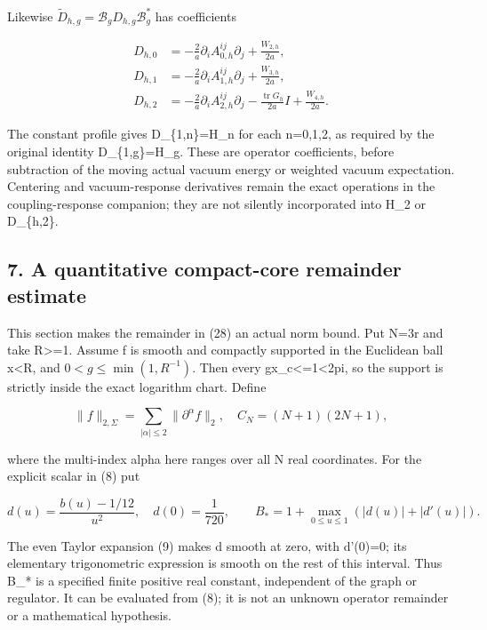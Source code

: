 \documentclass[
  11pt,
]{article}
\begin{document}
Likewise \(\widetilde D_{h,g}=\mathcal B_gD_{h,g}\mathcal B_g^*\) has
coefficients

\[
 \boxed{\begin{split}
 D_{h,0}&=-\frac2a\partial_i A_{0,h}^{ij}\partial_j
                                    +\frac{W_{2,h}}{2a},\\
 D_{h,1}&=-\frac2a\partial_i A_{1,h}^{ij}\partial_j
                                    +\frac{W_{3,h}}{2a},\\
 D_{h,2}&=-\frac2a\partial_i A_{2,h}^{ij}\partial_j
                     -\frac{\operatorname{tr}G_h}{2a}I
                                    +\frac{W_{4,h}}{2a}.
 \end{split}}                                                \tag{29}
\]

The constant profile gives D\_\{1,n\}=H\_n for each n=0,1,2, as required
by the original identity D\_\{1,g\}=H\_g. These are operator
coefficients, before subtraction of the moving actual vacuum energy or
weighted vacuum expectation. Centering and vacuum-response derivatives
remain the exact operations in the coupling-response companion; they are
not silently incorporated into H\_2 or D\_\{h,2\}.

\subsection{7. A quantitative compact-core remainder
estimate}\label{weak-coupling-part-14-a-quantitative-compact-core-remainder-estimate}

This section makes the remainder in (28) an actual norm bound. Put N=3r
and take R\textgreater=1. Assume f is smooth and compactly supported in
the Euclidean ball \textbar x\textbar\textless R, and
\(0<g\le\min(1,R^{-1})\). Then every
g\textbar x\_c\textbar\textless=1\textless2pi, so the support is
strictly inside the exact logarithm chart. Define

\[
 \|f\|_{2,\Sigma}=\sum_{|\alpha|\le2}\|\partial^\alpha f\|_2,
 \quad C_N=(N+1)(2N+1),
\]

where the multi-index alpha here ranges over all N real coordinates. For
the explicit scalar in (8) put

\[
 d(u)=\frac{b(u)-1/12}{u^2},\quad d(0)=\frac1{720},\qquad
 B_* =1+\max_{0\le u\le1}(|d(u)|+|d'(u)|).                  \tag{30}
\]

The even Taylor expansion (9) makes d smooth at zero, with d'(0)=0; its
elementary trigonometric expression is smooth on the rest of this
interval. Thus B\_* is a specified finite positive real constant,
independent of the graph or regulator. It can be evaluated from (8); it
is not an unknown operator remainder or a mathematical hypothesis.
\end{document}
